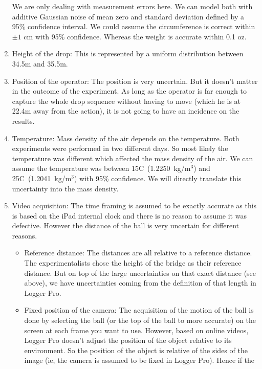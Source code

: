 \documentclass{article}
\begin{document}
\begin{enumerate}
We are only dealing with measurement errors here. We can model both with
       additive Gaussian noise of mean zero and standard deviation
       defined by a 95\% confidence interval. We could assume the
       circumference is correct within $\pm 1$ cm with 95\%
       confidence. Whereas the weight is accurate within 0.1 oz. 
 \item Height of the drop: This is represented by a uniform distribution
       between 34.5m and 35.5m. 
 \item Position of the operator: The position is very uncertain. But it
       doesn't matter in the outcome of the experiment. As long as the
       operator is far enough to capture the whole drop sequence without
       having to move (which he is at 22.4m away from the action), it is
       not going to have an incidence on the results. 
 \item Temperature: Mass density of the air depends on the
       temperature. Both experiments were performed in two different
       days. So most likely the temperature was different which affected
       the mass density of the air. We can assume the temperature was
       between 15C~(1.2250~kg/m$^3$) and 25C~(1.2041~kg/m$^3$) with 95\%
       confidence. We will directly translate this uncertainty into the
       mass density. 
 \item Video acquisition: The time framing is assumed to be exactly
       accurate as this is based on the iPad internal clock and there is
       no reason to assume it was defective. However the distance of the
       ball is very uncertain for different reasons. 
\begin{itemize}
 \item Reference distance: The distances are all relative to a reference
       distance. The experimentalists chose the height of the bridge as
       their reference distance. But on top of the large uncertainties
       on that exact distance (see above), we have uncertainties coming
       from the definition of that length in Logger Pro. 
 \item Fixed position of the camera: The acquisition of the motion of
       the ball is done by selecting the ball (or the top of the ball to
       more accurate) on the screen at each frame you want to
       use. However, based on online videos, Logger Pro doesn't adjust
       the position of the object relative to its environment. So the
       position of the object is relative of the sides of the image (ie,
       the camera is assumed to be fixed in Logger Pro). Hence if the

\end{itemize}
\end{enumerate}
\end{document}
